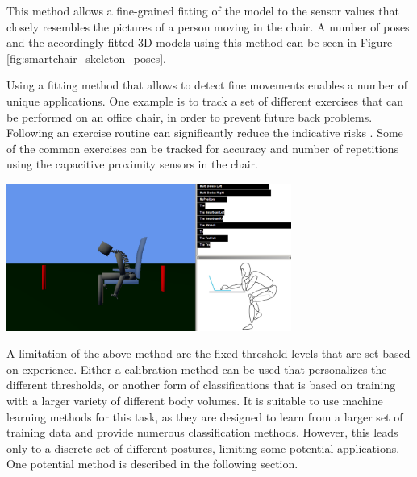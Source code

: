 This method allows a fine-grained fitting of the model to the sensor values that closely resembles the pictures of a person moving in the chair. A number of poses and the accordingly fitted 3D models using this method can be seen in Figure \ref{fig:smartchair_skeleton_poses}.

Using a fitting method that allows to detect fine movements enables a number of unique applications. One example is to track a set of different exercises that can be performed on an office chair, in order to prevent future back problems. Following an exercise routine can significantly reduce the indicative risks \cite{robertson2009effects}. Some of the common exercises can be tracked for accuracy and number of repetitions using the capacitive proximity sensors in the chair.

\begin{minipage}{\linewidth}
\centering
\includegraphics[width=0.7\textwidth]{images/smartchair_software}
\label{fig:smartchair_skeleton_poses}
\end{minipage}

A limitation of the above method are the fixed threshold levels that are set based on experience. Either a calibration method can be used that personalizes the different thresholds, or another form of classifications that is based on training with a larger variety of different body volumes. It is suitable to use machine learning methods for this task, as they are designed to learn from a larger set of training data and provide numerous classification methods. However, this leads only to a discrete set of different postures, limiting some potential applications. One potential method is described in the following section.

